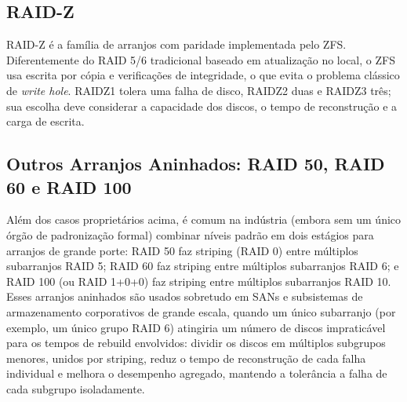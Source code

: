 \documentclass[11pt,a4paper]{article}
\begin{document}
\subsection{RAID-Z}
RAID-Z é a família de arranjos com paridade implementada pelo ZFS. Diferentemente do RAID 5/6 tradicional baseado em atualização no local, o ZFS usa escrita por cópia e verificações de integridade, o que evita o problema clássico de \textit{write hole}. RAIDZ1 tolera uma falha de disco, RAIDZ2 duas e RAIDZ3 três; sua escolha deve considerar a capacidade dos discos, o tempo de reconstrução e a carga de escrita.

\subsection{Outros Arranjos Aninhados: RAID 50, RAID 60 e RAID 100}
Além dos casos proprietários acima, é comum na indústria (embora sem um único órgão de padronização formal) combinar níveis padrão em dois estágios para arranjos de grande porte: RAID 50 faz striping (RAID 0) entre múltiplos subarranjos RAID 5; RAID 60 faz striping entre múltiplos subarranjos RAID 6; e RAID 100 (ou RAID 1+0+0) faz striping entre múltiplos subarranjos RAID 10. Esses arranjos aninhados são usados sobretudo em SANs e subsistemas de armazenamento corporativos de grande escala, quando um único subarranjo (por exemplo, um único grupo RAID 6) atingiria um número de discos impraticável para os tempos de rebuild envolvidos: dividir os discos em múltiplos subgrupos menores, unidos por striping, reduz o tempo de reconstrução de cada falha individual e melhora o desempenho agregado, mantendo a tolerância a falha de cada subgrupo isoladamente.
\end{document}
